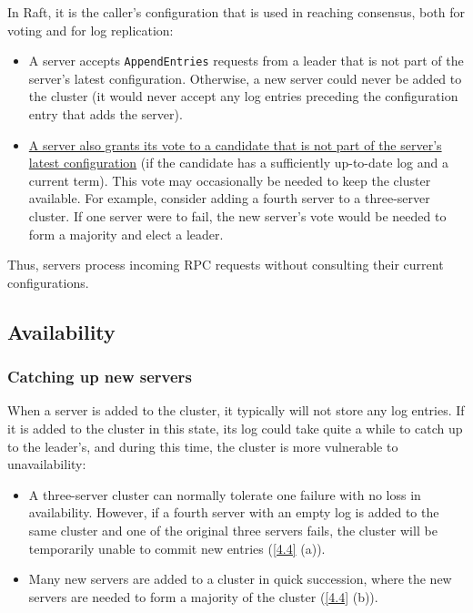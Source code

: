 \documentclass[11pt]{article}
\begin{document}
In Raft, it is the caller’s configuration that is used in reaching consensus, both for voting and for log replication:
\begin{itemize}
\item A server accepts \texttt{AppendEntries} requests from a leader that is not part of the server’s latest
configuration. Otherwise, a new server could never be added to the cluster (it would never accept any log entries preceding the configuration entry that adds the server).
\item \uline{A server also grants its vote to a candidate that is not part of the server’s latest configuration}
(if the candidate has a sufficiently up-to-date log and a current term). This vote may occasionally
be needed to keep the cluster available. For example, consider adding a fourth server to a
three-server cluster. If one server were to fail, the new server’s vote would be needed to form a
majority and elect a leader.
\end{itemize}

Thus, servers process incoming RPC requests without consulting their current configurations.
\subsection{Availability}
\label{sec:org3862a4a}
\subsubsection{Catching up new servers}
\label{sec:org4f2137e}
When a server is added to the cluster, it typically will not store any log entries. If it is added to
the cluster in this state, its log could take quite a while to catch up to the leader’s, and during
this time, the cluster is more vulnerable to unavailability:
\begin{itemize}
\item A three-server cluster can normally tolerate one failure with no loss in availability. However, if a
fourth server with an empty log is added to the same cluster and one of the original three servers
fails, the cluster will be temporarily unable to commit new entries (\ref{4.4} (a)).
\item Many new servers are added to a cluster in quick succession, where the new servers are needed to
form a majority of the cluster (\ref{4.4} (b)).
\end{itemize}
\end{document}

